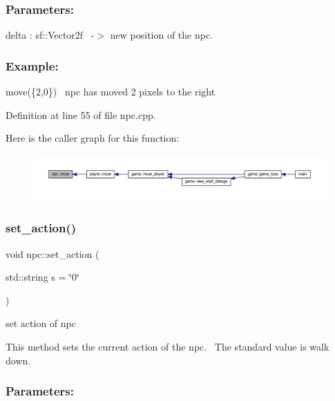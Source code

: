 \subsubsection*{Parameters\+: }

delta \+: sf\+::\+Vector2f~\newline
-\/$>$ new position of the npc.

\subsubsection*{Example\+: }

move(\{2,0\})~\newline
npc has moved 2 pixels to the right~\newline


Definition at line 55 of file npc.\+cpp.

Here is the caller graph for this function\+:
\nopagebreak
\begin{figure}[H]
\begin{center}
\leavevmode
\includegraphics[width=350pt]{classnpc_ae8d1bfcd87382237192ebb5b6def33a5_icgraph}
\end{center}
\end{figure}
\mbox{\label{classnpc_aa86a880284a09f9fc3358a61a74be1b9}} 
\subsubsection{\texorpdfstring{set\+\_\+action()}{set\_action()}}
{\footnotesize\ttfamily void npc\+::set\+\_\+action (\begin{DoxyParamCaption}\item[{std\+::string}]{s = {\ttfamily \char`\"{}0\char`\"{}} }\end{DoxyParamCaption})}



set action of npc 

This method sets the current action of the npc.~\newline
The standard value is walk down.~\newline


\subsubsection*{Parameters\+: }

